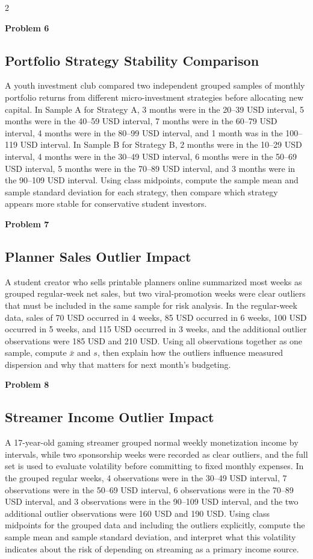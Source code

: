 \documentclass[12pt]{article}
\newcommand{\SubsectionBox}[1]{%
\noindent\colorbox{gray!30}{\parbox{\linewidth}{\textbf{#1}}}\par\vspace{0.35cm}%
}
\begin{document}
\begin{multicols}{2}
\vspace{0.5cm}
\SubsectionBox{Problem 6}
\subsection*{Portfolio Strategy Stability Comparison}
A youth investment club compared two independent grouped samples of monthly portfolio returns from different micro-investment strategies before allocating new capital. In Sample A for Strategy A, 3 months were in the 20--39 USD interval, 5 months were in the 40--59 USD interval, 7 months were in the 60--79 USD interval, 4 months were in the 80--99 USD interval, and 1 month was in the 100--119 USD interval. In Sample B for Strategy B, 2 months were in the 10--29 USD interval, 4 months were in the 30--49 USD interval, 6 months were in the 50--69 USD interval, 5 months were in the 70--89 USD interval, and 3 months were in the 90--109 USD interval. Using class midpoints, compute the sample mean and sample standard deviation for each strategy, then compare which strategy appears more stable for conservative student investors.

\vspace{0.5cm}
\SubsectionBox{Problem 7}
\subsection*{Planner Sales Outlier Impact}
A student creator who sells printable planners online summarized most weeks as grouped regular-week net sales, but two viral-promotion weeks were clear outliers that must be included in the same sample for risk analysis. In the regular-week data, sales of 70 USD occurred in 4 weeks, 85 USD occurred in 6 weeks, 100 USD occurred in 5 weeks, and 115 USD occurred in 3 weeks, and the additional outlier observations were 185 USD and 210 USD. Using all observations together as one sample, compute $\bar{x}$ and $s$, then explain how the outliers influence measured dispersion and why that matters for next month's budgeting.

\vspace{0.5cm}
\SubsectionBox{Problem 8}
\subsection*{Streamer Income Outlier Impact}
A 17-year-old gaming streamer grouped normal weekly monetization income by intervals, while two sponsorship weeks were recorded as clear outliers, and the full set is used to evaluate volatility before committing to fixed monthly expenses. In the grouped regular weeks, 4 observations were in the 30--49 USD interval, 7 observations were in the 50--69 USD interval, 6 observations were in the 70--89 USD interval, and 3 observations were in the 90--109 USD interval, and the two additional outlier observations were 160 USD and 190 USD. Using class midpoints for the grouped data and including the outliers explicitly, compute the sample mean and sample standard deviation, and interpret what this volatility indicates about the risk of depending on streaming as a primary income source.


\end{multicols}
\end{document}
